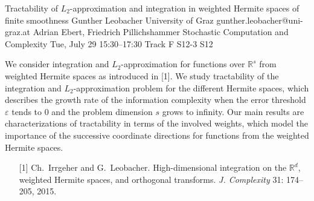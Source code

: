 \begin{talk}
  {Tractability of $L_2$-approximation and integration in weighted Hermite spaces of finite smoothness}%
  {Gunther Leobacher}%
  {University of Graz}%
  {gunther.leobacher@uni-graz.at}%
  {Adrian Ebert, Friedrich Pillichshammer}%
  {Stochastic Computation and Complexity}%
  {Tue, July 29 15:30–17:30 Track F}%
  {S12-3}%
  {S12}%
				
			

We consider integration and $L_2$-approximation for functions over $\mathbb R^s$ from weighted Hermite spaces as introduced in [1]. We study tractability of the integration and $L_2$-approximation problem for the different Hermite spaces, which describes the growth rate of the information complexity when the error threshold $\varepsilon$ tends to 0 and the problem dimension $s$ grows to infinity. Our main results are characterizations of tractability in terms of the involved weights, which  model the importance of the successive coordinate directions for functions from the weighted Hermite spaces.

\medskip

\begin{enumerate}
	\item[{[1]}] Ch.~Irrgeher and G.~Leobacher. High-dimensional integration on the $\mathbb R^d$, weighted Hermite spaces, and orthogonal transforms. \textit{J. Complexity} 31: 174--205, 2015. 
\end{enumerate}


\end{talk}

